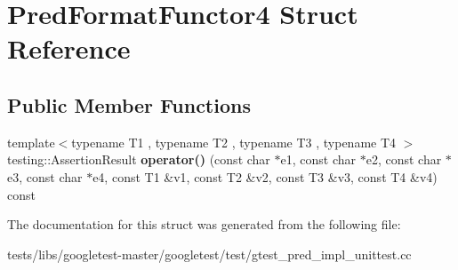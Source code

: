 \hypertarget{structPredFormatFunctor4}{}\section{Pred\+Format\+Functor4 Struct Reference}
\label{structPredFormatFunctor4}
\subsection*{Public Member Functions}
\begin{DoxyCompactItemize}
\item 
\mbox{\label{structPredFormatFunctor4_a97061d2b9eadf357f4e50a75f5a9af5b}} 
{\footnotesize template$<$typename T1 , typename T2 , typename T3 , typename T4 $>$ }\\testing\+::\+Assertion\+Result {\bfseries operator()} (const char $\ast$e1, const char $\ast$e2, const char $\ast$e3, const char $\ast$e4, const T1 \&v1, const T2 \&v2, const T3 \&v3, const T4 \&v4) const
\end{DoxyCompactItemize}


The documentation for this struct was generated from the following file\+:\begin{DoxyCompactItemize}
\item 
tests/libs/googletest-\/master/googletest/test/gtest\+\_\+pred\+\_\+impl\+\_\+unittest.\+cc\end{DoxyCompactItemize}
